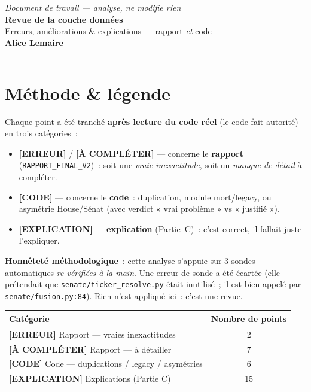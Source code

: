 \documentclass[11pt,a4paper]{article}
\newcommand{\co}[1]{\texttt{\small #1}}
\newcommand{\tagErr}{\textcolor{red!75!black}{\textbf{[ERREUR]}}}
\newcommand{\tagAmel}{\textcolor{orange!90!black}{\textbf{[À COMPLÉTER]}}}
\newcommand{\tagCode}{\textcolor{blue!70!black}{\textbf{[CODE]}}}
\newcommand{\tagExp}{\textcolor{green!50!black}{\textbf{[EXPLICATION]}}}
\begin{document}
\begin{center}
{\small\itshape Document de travail — analyse, ne modifie rien}\\[3pt]
{\LARGE\bfseries\color{coreC} Revue de la couche données}\\[3pt]
{\large Erreurs, améliorations \& explications — rapport \emph{et} code}\\[5pt]
{\bfseries Alice Lemaire}\quad\textperiodcentered\quad{\small\today}
\end{center}
\vspace{2pt}\hrule\vspace{6pt}

\section*{Méthode \& légende}
Chaque point a été tranché \textbf{après lecture du code réel} (le code fait autorité) en trois
catégories~:
\begin{itemize}[nosep,leftmargin=1.4em]
\item \tagErr{} / \tagAmel{} — concerne le \textbf{rapport} (\co{RAPPORT_FINAL_V2})~: soit une
\emph{vraie inexactitude}, soit un \emph{manque de détail} à compléter.
\item \tagCode{} — concerne le \textbf{code}~: duplication, module mort/legacy, ou asymétrie
House/Sénat (avec verdict « vrai problème » vs « justifié »).
\item \tagExp{} — \textbf{explication} (Partie~C)~: c'est correct, il fallait juste l'expliquer.
\end{itemize}
\textbf{Honnêteté méthodologique}~: cette analyse s'appuie sur 3 sondes automatiques \emph{re-vérifiées
à la main}. Une erreur de sonde a été écartée (elle prétendait que \co{senate/ticker_resolve.py} était
inutilisé~; il est bien appelé par \co{senate/fusion.py:84}). Rien n'est appliqué ici~: c'est une revue.

\medskip
\begin{center}\small
\begin{tabular}{lc}
\toprule
\bfseries Catégorie & \bfseries Nombre de points\\
\midrule
\tagErr{} Rapport — vraies inexactitudes & 2 \\
\tagAmel{} Rapport — à détailler & 7 \\
\tagCode{} Code — duplications / legacy / asymétries & 6 \\
\tagExp{} Explications (Partie C) & 15 \\
\bottomrule
\end{tabular}
\end{center}
\end{document}
